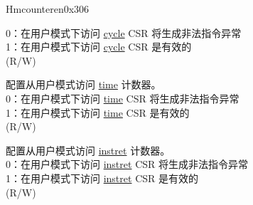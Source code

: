 \begin{register}{H}{mcounteren}{0x306}
\begin{regdesc}
\begin{reglist}
0：在用户模式下访问 \hyperref[regdesc:CYCLE]{cycle} CSR 将生成非法指令异常 \\
1：在用户模式下访问 \hyperref[regdesc:CYCLE]{cycle} CSR 是有效的 \\
(R/W) \\
\label{fielddesc:MCOUNTEREN_TM}\item [TM] 配置从用户模式访问 \hyperref[regdesc:TIME]{time} 计数器。 \\
0：在用户模式下访问 \hyperref[regdesc:TIME]{time} CSR 将生成非法指令异常 \\
1：在用户模式下访问 \hyperref[regdesc:TIME]{time} CSR 是有效的\\
(R/W)  \\
\label{fielddesc:MCOUNTEREN_IR}\item [IR] 配置从用户模式访问 \hyperref[regdesc:INSTRET]{instret} 计数器。 \\
0：在用户模式下访问 \hyperref[regdesc:INSTRET]{instret} CSR 将生成非法指令异常\\
1：在用户模式下访问 \hyperref[regdesc:INSTRET]{instret} CSR 是有效的 \\
(R/W) \\
\end{reglist}\end{regdesc}
\end{register}


